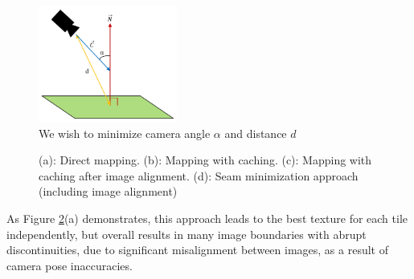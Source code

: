 \documentclass[10pt,twocolumn,letterpaper]{article}
\begin{document}
\begin{figure}
  \centering
  \includegraphics[height=1.5in]{scoringFunction.pdf}
  \caption{We wish to minimize camera angle $\alpha$ and distance $d$}
  \label{fig:scoringFunction}
\end{figure}



\begin{figure}
  \centering

  \centering

  \centering

  \centering
  \caption{(a): Direct mapping. (b): Mapping with caching. (c):
    Mapping with caching after image alignment. (d): Seam minimization approach (including image alignment)}
  \label{fig:compareAll}
\end{figure}


As Figure \ref{fig:compareAll}(a) demonstrates, this approach leads
to the best texture for each tile independently, but overall results
in many image boundaries with abrupt discontinuities, due to
significant misalignment between images, as a result of camera pose
inaccuracies.
\end{document}
